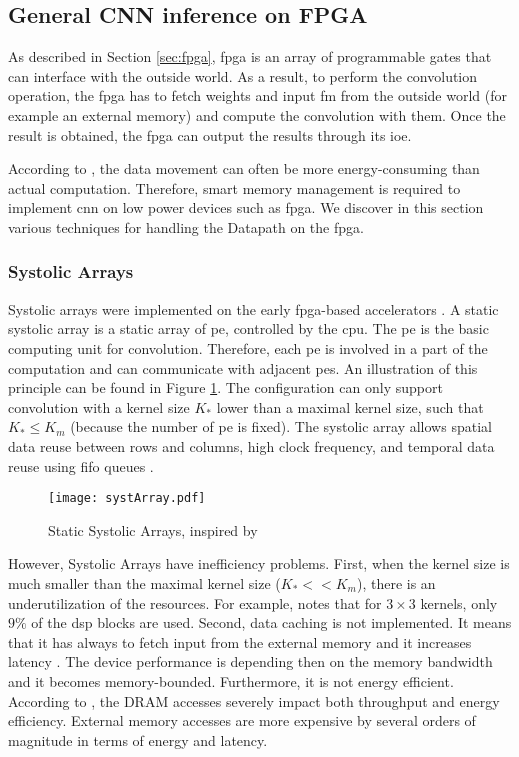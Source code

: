 \subsection{General CNN inference on FPGA} \label{sec:dt_general}
%
As described in Section \ref{sec:fpga}, \acrshort{fpga} is an array of programmable gates that can interface with the outside world. As a result, to perform the convolution operation, the \acrshort{fpga} has to fetch weights and input \acrshort{fm} from the outside world (for example an external memory) and compute the convolution with them. Once the result is obtained, the \acrshort{fpga} can output the results through its \acrshort{ioe}.

According to \textcite{chen_eyeriss_2017}, the data movement can often be more energy-consuming than actual computation. Therefore, smart memory management is required to implement \acrshort{cnn} on low power devices such as \acrshort{fpga}. We discover in this section various techniques for handling the Datapath on the \acrshort{fpga}.

\subsubsection{Systolic Arrays}
%
%
Systolic arrays were implemented on the early \acrshort{fpga}-based accelerators \cite{abdelouahab_accelerating_2018, farabet_cnp_2009, gokhale_240_2014}. A static systolic array is a static array of \acrfull{pe}, controlled by the \acrshort{cpu}. The \acrshort{pe} is the basic computing unit for convolution. Therefore, each \acrshort{pe} is involved in a part of the computation and can communicate with adjacent \acrshort{pe}s. An illustration of this principle can be found in Figure \ref{fig:sytar}. The configuration can only support convolution with a kernel size $K_*$ lower than a maximal kernel size, such that $K_* \leq K_m$ (because the number of \acrshort{pe} is fixed). The systolic array allows spatial data reuse between rows and columns, high clock frequency, and temporal data reuse using \acrshort{fifo} queues \cite{joos_de_ter_beerst_accelerating_2019, mittal_survey_2020}.
%
\begin{figure}[H]
    \centering
    \texttt{[image: systArray.pdf]}
    \caption{Static Systolic Arrays, inspired by \cite{abdelouahab_accelerating_2018}}
    \label{fig:sytar}
\end{figure}

However, Systolic Arrays have inefficiency problems. First, when the kernel size is much smaller than the maximal kernel size ($K_* << K_m$), there is an underutilization of the resources. For example, \cite{gokhale_240_2014} notes that for $3 \times 3$ kernels, only $9\%$ of the \acrfull{dsp} blocks are used. Second, data caching is not implemented. It means that it has always to fetch input from the external memory and it increases latency \cite{abdelouahab_accelerating_2018, wei_automated_2017}. The device performance is depending then on the memory bandwidth and it becomes memory-bounded. Furthermore, it is not energy efficient. According to \textcite{horowitz_11_2014}, the DRAM accesses severely impact both throughput and energy efficiency. External memory accesses are more expensive by several orders of magnitude in terms of energy and latency.
%
%
